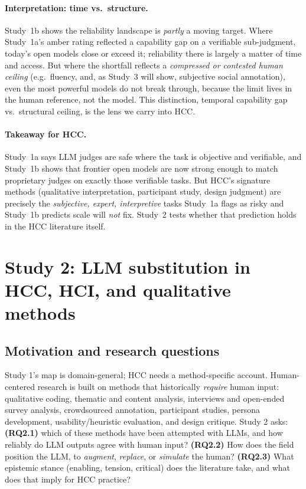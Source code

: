 \paragraph{Interpretation: time vs.\ structure.} Study~1b shows the reliability landscape is \emph{partly} a moving
target. Where Study~1a's amber rating reflected a capability gap on a verifiable sub-judgment, today's open models
close or exceed it; reliability there is largely a matter of time and access. But where the shortfall reflects a
\emph{compressed or contested human ceiling} (e.g.\ fluency, and, as Study~3 will show, subjective social annotation),
even the most powerful models do not break through, because the limit lives in the human reference, not the model.
This distinction, temporal capability gap vs.\ structural ceiling, is the lens we carry into HCC.

\paragraph{Takeaway for HCC.} Study~1a says LLM judges are safe where the task is objective and verifiable, and
Study~1b shows that frontier open models are now strong enough to match proprietary judges on exactly those
verifiable tasks. But HCC's signature methods (qualitative interpretation, participant study, design
judgment) are precisely the \emph{subjective, expert, interpretive} tasks Study~1a flags as risky and Study~1b
predicts scale will \emph{not} fix. Study~2 tests whether that prediction holds in the HCC literature itself.

\section{Study 2: LLM substitution in HCC, HCI, and qualitative methods}
\subsection{Motivation and research questions}
Study 1's map is domain-general; HCC needs a method-specific account. Human-centered research is built on methods
that historically \emph{require} human input: qualitative coding, thematic and content analysis, interviews and
open-ended survey analysis, crowdsourced annotation, participant studies, persona development, usability/heuristic
evaluation, and design critique. Study 2 asks: \textbf{(RQ2.1)} which of these methods have been attempted with
LLMs, and how reliably do LLM outputs agree with human input? \textbf{(RQ2.2)} How does the field position the
LLM, to \emph{augment}, \emph{replace}, or \emph{simulate} the human? \textbf{(RQ2.3)} What epistemic stance
(enabling, tension, critical) does the literature take, and what does that imply for HCC practice?

